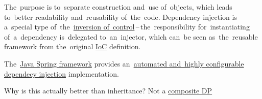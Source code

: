 The~purpose is to~separate construction and~use of~objects, which leads to~better readability and~reusability of~the~code.
Dependency injection is a~special type of~the~\hyperref[inversionofcontrol]{inversion of~control}\,--\,the~responsibility for~instantiating of~a~dependency is~delegated to~an~injector, which can~be seen as~the~reusable framework from the~original \hyperref[inversionofcontrol]{IoC} definition.

The~\hyperref[springframework]{Java Spring framework} provides an~\hyperref[springdependencyinjection]{automated and~highly configurable dependecy injection} implementation.

\label{compositionoverinheritance}
\todo Why is this actually better than inheritance?
\warning \todononl Not a \hyperref[compositedp]{composite DP}
